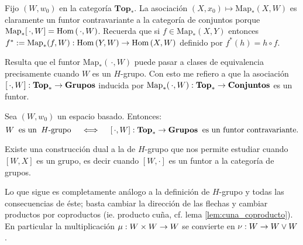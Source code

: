 \documentclass[../../topologia_algebraica]{subfiles}
\begin{document}
Fijo $(W,w_0)$ en la categor\'ia $\mathbf{Top}_*$. La asociaci\'on
$(X,x_0)\mapsto \text{Map}_*(X,W)$ es claramente un funtor contravariante a la categor\'ia de
conjuntos porque $\text{Map}_*[\,\cdot,W]=\text{Hom}\left( \,\cdot,W \right)$. Recuerda que si $f\in\text{Map}_*(X,Y)$
entonces $f^*:=\text{Map}_*(f,W):\text{Hom}\left( Y,W \right)\rightarrow\text{Hom}\left( X,W \right)$ definido por $f^*(h)=h\circ f$.

Resulta que el funtor $\text{Map}_*(\,\cdot,W)$ puede pasar a clases de equivalencia precisamente
cuando $W$ es un $H$-grupo. Con esto me refiero a que la asociaci\'on
$[\,\cdot,W]:\mathbf{Top}_*\rightarrow\mathbf{Grupos}$ inducida por
$\text{Map}_*(\,\cdot,W):\mathbf{Top}_*\rightarrow\mathbf{Conjuntos}$ es un funtor.

\begin{thm}\label{thm:hgrupo_funtor}
  Sea $(W,w_0)$ un espacio basado. Entonces:
  \[
    W \;\;\text{es un}\;\;H\text{-grupo} \quad\iff\quad
    [\,\cdot,W]:\mathbf{Top}_*\rightarrow\mathbf{Grupos}\;\;\text{es un funtor contravariante}.
  \]
\end{thm}

Existe una construcci\'on dual a la de $H$-grupo que nos permite estudiar cuando $[W,X]$ es un grupo,
es decir cuando $[W,\cdot]$ es un funtor a la categor\'ia de grupos.

Lo que sigue es completamente an\'alogo a la definici\'on de $H$-grupo y todas las consecuencias
de \'este; basta cambiar la direcci\'on de las flechas y cambiar productos por coproductos (ie. producto
cu\~na, cf. lema \ref{lem:cuna_coproducto}). En particular la multiplicaci\'on $\mu:W\times W\rightarrow W$ se
convierte en $\nu:W\rightarrow W\vee W$.
\end{document}
